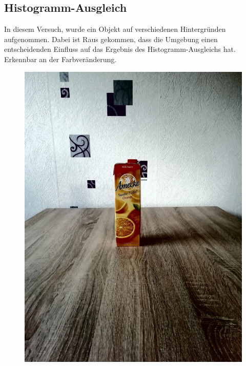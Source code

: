 \begin{appendices}
\section*{Histogramm-Ausgleich}
In diesem Versuch, wurde ein Objekt auf verschiedenen Hintergründen aufgenommen. Dabei ist Raus gekommen, dass die Umgebung einen entscheidenden Einfluss auf das Ergebnis des Histogramm-Ausgleichs hat. Erkennbar an der Farbveränderung.
\begin{figure}[htb]
\begin{minipage}[c]{0.2\textwidth}
\includegraphics[width=\textwidth]{Sources/Bild1_HA.jpg}
\end{minipage}
\hfill
\begin{minipage}[c]{0.08\textwidth}

\end{minipage}
\end{figure}
\end{appendices}

